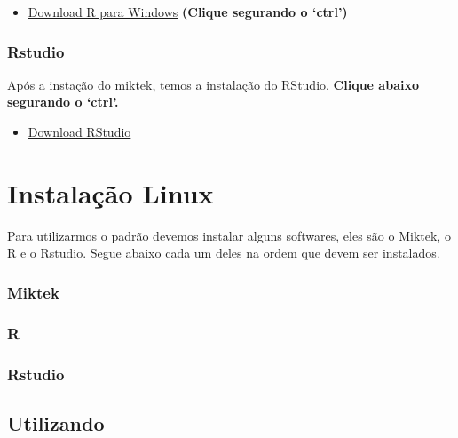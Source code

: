 \documentclass[
]{article}
\providecommand{\tightlist}{%
  \setlength{\itemsep}{0pt}\setlength{\parskip}{0pt}}
\begin{document}
\begin{itemize}
\tightlist
\item
  \href{https://cran-r.c3sl.ufpr.br/}{Download R para Windows} \textbf{(Clique segurando o `ctrl')}
\end{itemize}

\hypertarget{rstudio}{%
\subsubsection{Rstudio}\label{rstudio}}

Após a instação do miktek, temos a instalação do RStudio. \textbf{Clique abaixo segurando o `ctrl'.}

\begin{itemize}
\tightlist
\item
  \href{https://rstudio.com/products/rstudio/download/\#download}{Download RStudio}
\end{itemize}

\hypertarget{instalauxe7uxe3o-linux}{%
\section{Instalação Linux}\label{instalauxe7uxe3o-linux}}

Para utilizarmos o padrão devemos instalar alguns softwares, eles são o Miktek, o R e o Rstudio. Segue abaixo cada um deles na ordem que devem ser instalados.

\hypertarget{miktek-1}{%
\subsubsection{Miktek}\label{miktek-1}}

\hypertarget{r-1}{%
\subsubsection{R}\label{r-1}}

\hypertarget{rstudio-1}{%
\subsubsection{Rstudio}\label{rstudio-1}}

\hypertarget{utilizando}{%
\subsection{Utilizando}\label{utilizando}}

  
\end{document}
